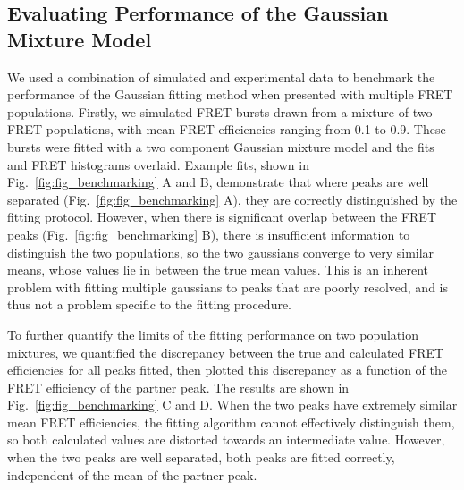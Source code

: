 \subsection*{Evaluating Performance of the Gaussian Mixture Model}
We used a combination of simulated and experimental data to benchmark the performance of the Gaussian fitting method when presented with multiple FRET populations. Firstly, we simulated FRET bursts drawn from a mixture of two FRET populations, with mean FRET efficiencies ranging from 0.1 to 0.9. These bursts were fitted with a two component Gaussian mixture model and the fits and FRET histograms overlaid. Example fits, shown in Fig.~\ref{fig:fig_benchmarking} A and B, demonstrate that where peaks are well separated (Fig.~\ref{fig:fig_benchmarking} A), they are correctly distinguished by the fitting protocol. However, when there is significant overlap between the FRET peaks (Fig.~\ref{fig:fig_benchmarking} B), there is insufficient information to distinguish the two populations, so the two gaussians converge to very similar means, whose values lie in between the true mean values. This is an inherent problem with fitting multiple gaussians to peaks that are poorly resolved, and is thus not a problem specific to the fitting procedure.

To further quantify the limits of the fitting performance on two population mixtures, we quantified the discrepancy between the true and calculated FRET efficiencies for all peaks fitted, then plotted this discrepancy as a function of the FRET efficiency of the partner peak. The results are shown in Fig.~\ref{fig:fig_benchmarking} C and D. When the two peaks have extremely similar mean FRET efficiencies, the fitting algorithm cannot effectively distinguish them, so both calculated values are distorted towards an intermediate value. However, when the two peaks are well separated, both peaks are fitted correctly, independent of the mean of the partner peak.

